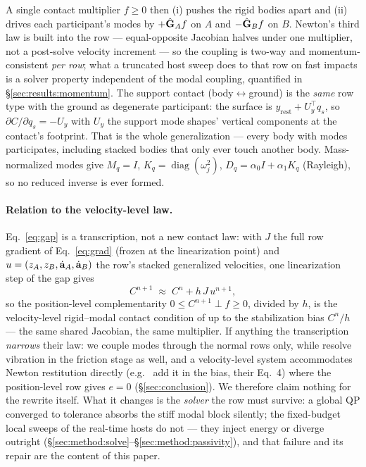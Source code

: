 A single contact multiplier $f\ge 0$ then (i)
pushes the rigid bodies apart and (ii) drives each participant's modes by
$+\hat{\mathbf{G}}_A f$ on $A$ and $-\hat{\mathbf{G}}_B f$ on $B$. Newton's third law is built into
the row --- equal-opposite Jacobian halves under one multiplier, not a
post-solve velocity increment --- so the coupling is two-way and momentum-consistent
\emph{per row}; what a truncated host sweep does to that row on fast impacts
is a solver property independent of the modal coupling, quantified in
\S\ref{sec:results:momentum}. The support contact (body$\leftrightarrow$ground) is the \emph{same} row type
with the ground as degenerate participant: the surface is
$y_{\mathrm{rest}}+U_y^{\!\top}q_s$, so $\partial C/\partial q_s=-U_y$ with $U_y$
the support mode shapes' vertical components at the contact's footprint. That is
the whole generalization --- every body with modes participates, including stacked
bodies that only ever touch another body. Mass-normalized modes give
$M_q=I$, $K_q=\operatorname{diag}(\omega_j^2)$, $D_q=\alpha_0 I+\alpha_1 K_q$
(Rayleigh), so no reduced inverse is ever formed.

\paragraph*{Relation to the velocity-level law.}
Eq.~\ref{eq:gap} is a transcription, not a new contact law: with $J$ the full
row gradient of Eq.~\ref{eq:grad} (frozen at the linearization point) and
$u=(z_A,z_B,\dot{\mathbf{a}}_A,\dot{\mathbf{a}}_B)$ the row's stacked generalized velocities,
one linearization step of the gap gives
\begin{equation}
  C^{n+1} \;\approx\; C^{n} + h\,J\,u^{n+1},
  \label{eq:velequiv}
\end{equation}
so the position-level complementarity $0\le C^{n+1}\perp f\ge0$, divided by
$h$, is the velocity-level rigid--modal contact condition of
\citet{zheng2011} up to the stabilization bias $C^{n}/h$ --- the same shared
Jacobian, the same multiplier. If anything the transcription \emph{narrows}
their law: we couple modes through the normal rows only, while
\citet{zheng2011} resolve vibration in the friction stage as well, and a
velocity-level system accommodates Newton restitution directly (e.g.\
\citealp{coevoet2020distant} add it in the bias, their Eq.~4) where the
position-level row gives
$e{=}0$ (\S\ref{sec:conclusion}). We therefore claim nothing for the rewrite
itself. What it changes is the \emph{solver} the row must survive: a global
QP converged to tolerance absorbs the stiff modal block silently; the
fixed-budget local sweeps of the real-time hosts do not --- they inject
energy or diverge outright
(\S\ref{sec:method:solve}--\S\ref{sec:method:passivity}), and that failure
and its repair are the content of this paper.

